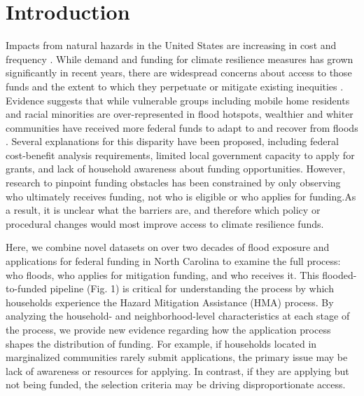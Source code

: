\documentclass[
  authoryear,
  preprint]{elsarticle}
\begin{document}
\section{Introduction}\label{introduction}

Impacts from natural hazards in the United States are increasing in cost
and frequency \citep{noaa2024}. While demand and funding for climate
resilience measures has grown significantly in recent years, there are
widespread concerns about access to those funds and the extent to which
they perpetuate or mitigate existing inequities
\citep{fema2023, junod2021, miller2023}. Evidence suggests that while
vulnerable groups including mobile home residents and racial minorities
are over-represented in flood hotspots, wealthier and whiter communities
have received more federal funds to adapt to and recover from floods
\citep{elliott2020, tate2021}. Several explanations for this disparity
have been proposed, including federal cost-benefit analysis
requirements, limited local government capacity to apply for grants, and
lack of household awareness about funding opportunities. However,
research to pinpoint funding obstacles has been constrained by only
observing who ultimately receives funding, not who is eligible or who
applies for funding.As a result, it is unclear what the barriers are,
and therefore which policy or procedural changes would most improve
access to climate resilience funds.

Here, we combine novel datasets on over two decades of flood exposure
and applications for federal funding in North Carolina to examine the
full process: who floods, who applies for mitigation funding, and who
receives it. This flooded-to-funded pipeline (Fig. 1) is critical for
understanding the process by which households experience the Hazard
Mitigation Assistance (HMA) process. By analyzing the household- and
neighborhood-level characteristics at each stage of the process, we
provide new evidence regarding how the application process shapes the
distribution of funding. For example, if households located in
marginalized communities rarely submit applications, the primary issue
may be lack of awareness or resources for applying. In contrast, if they
are applying but not being funded, the selection criteria may be driving
disproportionate access.
\end{document}
